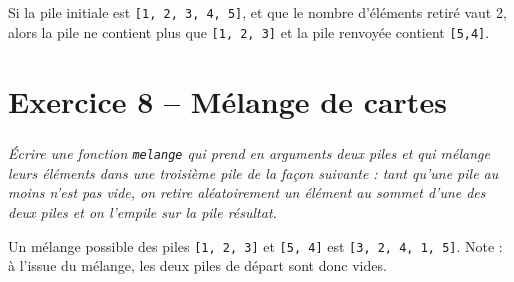 \begin{exemple}
Si la pile initiale est \texttt{[1, 2, 3, 4, 5]}, et que le nombre d’éléments retiré vaut 2, alors la pile ne contient plus que \texttt{[1, 2, 3]} et la pile renvoyée contient \texttt{[5,4]}.
\end{exemple}
\ifprof
\begin{corrige}
\end{corrige}
\else
\fi

\section*{Exercice 8 -- Mélange de cartes}
\setcounter{exo}{0}
\subparagraph*{}
\textit{Écrire une fonction \texttt{melange} qui prend en arguments deux piles et qui
mélange leurs éléments dans une troisième pile de la façon suivante : tant qu’une pile au moins n’est pas vide, on retire aléatoirement un élément au sommet d’une des deux piles et on l’empile sur la pile résultat. }
\begin{exemple}
Un mélange possible des piles \texttt{[1, 2, 3]} et \texttt{[5, 4]} est \texttt{[3, 2, 4, 1, 5]}. Note : à l’issue du mélange, les deux piles de départ sont donc vides.
\end{exemple}

\ifprof
\begin{corrige}
\end{corrige}
\else
\fi
%


